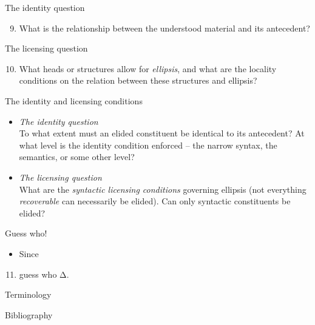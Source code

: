 \documentclass[ignorenonframetext,]{beamer}
\newif\ifbibliography
\providecommand{\tightlist}{%
  \setlength{\itemsep}{0pt}\setlength{\parskip}{0pt}}
\begin{document}
\begin{frame}{%
\protect\hypertarget{the-identity-question}{%
The identity question}}

\begin{enumerate}
[(1)]
\setcounter{enumi}{8}
\tightlist
\item
  What is the relationship between the understood material and its
  antecedent?
\end{enumerate}

\end{frame}

\begin{frame}{%
\protect\hypertarget{the-licensing-question}{%
The licensing question}}

\begin{enumerate}
[(1)]
\setcounter{enumi}{9}
\tightlist
\item
  What heads or structures allow for \emph{ellipsis}, and what are the
  locality conditions on the relation between these structures and
  ellipsis?
\end{enumerate}

\end{frame}

\begin{frame}{%
\protect\hypertarget{the-identity-and-licensing-conditions}{%
The identity and licensing conditions}}

\begin{itemize}
\item
  \emph{The identity question}\\
  To what extent must an elided constituent be identical to its
  antecedent? At what level is the identity condition enforced – the
  narrow syntax, the semantics, or some other level?
\item
  \emph{The licensing question}\\
  What are the \emph{syntactic licensing conditions} governing ellipsis
  (not everything \emph{recoverable} can necessarily be elided). Can
  only syntactic constituents be elided?
\end{itemize}

\end{frame}

\begin{frame}{%
\protect\hypertarget{guess-who}{%
Guess who!}}

\begin{itemize}
\tightlist
\item
  Since \textcite{Ross}
\end{itemize}

\begin{enumerate}
[(1)]
\setcounter{enumi}{10}
\tightlist
\item
  guess who Δ.
\end{enumerate}

\end{frame}

\begin{frame}{%
\protect\hypertarget{terminology-1}{%
Terminology}}

\end{frame}

\begin{frame}[allowframebreaks]{Bibliography}
\bibliographytrue
\printbibliography[heading=none]
\end{frame}
\end{document}
